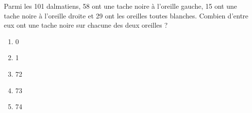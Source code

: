Parmi les 101 dalmatiens, 58 ont une tache noire à l'oreille gauche,
15 ont une tache noire à l'oreille droite et 29 ont les oreilles
toutes blanches. Combien d'entre eux ont une tache noire sur chacune
des deux oreilles ?
\begin{multicols}{5}
  \begin{enumerate}[A/]
  \item 0
  \item 1
  \item 72
  \item 73
  \item 74
  \end{enumerate}
\end{multicols}